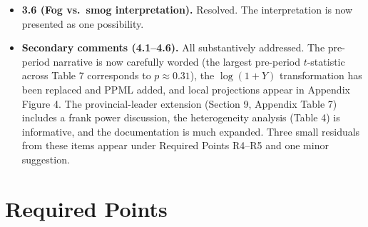 \documentclass[12pt]{article}
\begin{document}
\begin{itemize}
    \item \textbf{3.6 (Fog vs.\ smog interpretation).} Resolved. The interpretation is now presented as one possibility.

    \item \textbf{Secondary comments (4.1--4.6).} All substantively addressed. The pre-period narrative is now carefully worded (the largest pre-period $t$-statistic across Table 7 corresponds to $p \approx 0.31$), the $\log(1+Y)$ transformation has been replaced and PPML added, and local projections appear in Appendix Figure 4. The provincial-leader extension (Section 9, Appendix Table 7) includes a frank power discussion, the heterogeneity analysis (Table 4) is informative, and the documentation is much expanded. Three small residuals from these items appear under Required Points R4--R5 and one minor suggestion.
\end{itemize}

\section{Required Points}
\end{document}
